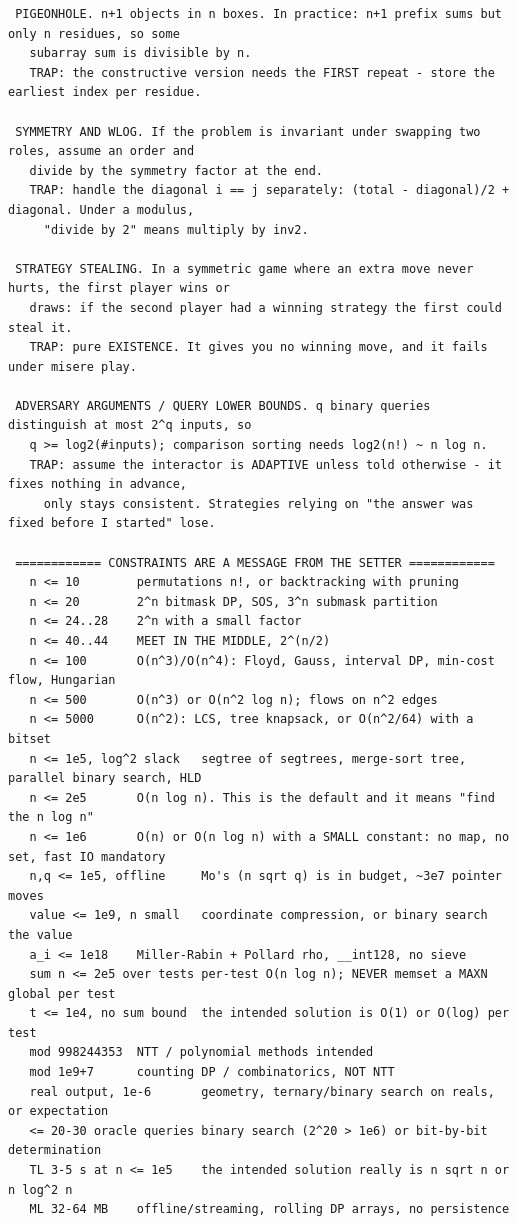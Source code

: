 \documentclass[9pt,a4paper,twocolumn]{extarticle}
\begin{document}
\begin{lstlisting}
 PIGEONHOLE. n+1 objects in n boxes. In practice: n+1 prefix sums but only n residues, so some
   subarray sum is divisible by n.
   TRAP: the constructive version needs the FIRST repeat - store the earliest index per residue.

 SYMMETRY AND WLOG. If the problem is invariant under swapping two roles, assume an order and
   divide by the symmetry factor at the end.
   TRAP: handle the diagonal i == j separately: (total - diagonal)/2 + diagonal. Under a modulus,
     "divide by 2" means multiply by inv2.

 STRATEGY STEALING. In a symmetric game where an extra move never hurts, the first player wins or
   draws: if the second player had a winning strategy the first could steal it.
   TRAP: pure EXISTENCE. It gives you no winning move, and it fails under misere play.

 ADVERSARY ARGUMENTS / QUERY LOWER BOUNDS. q binary queries distinguish at most 2^q inputs, so
   q >= log2(#inputs); comparison sorting needs log2(n!) ~ n log n.
   TRAP: assume the interactor is ADAPTIVE unless told otherwise - it fixes nothing in advance,
     only stays consistent. Strategies relying on "the answer was fixed before I started" lose.

 ============ CONSTRAINTS ARE A MESSAGE FROM THE SETTER ============
   n <= 10        permutations n!, or backtracking with pruning
   n <= 20        2^n bitmask DP, SOS, 3^n submask partition
   n <= 24..28    2^n with a small factor
   n <= 40..44    MEET IN THE MIDDLE, 2^(n/2)
   n <= 100       O(n^3)/O(n^4): Floyd, Gauss, interval DP, min-cost flow, Hungarian
   n <= 500       O(n^3) or O(n^2 log n); flows on n^2 edges
   n <= 5000      O(n^2): LCS, tree knapsack, or O(n^2/64) with a bitset
   n <= 1e5, log^2 slack   segtree of segtrees, merge-sort tree, parallel binary search, HLD
   n <= 2e5       O(n log n). This is the default and it means "find the n log n"
   n <= 1e6       O(n) or O(n log n) with a SMALL constant: no map, no set, fast IO mandatory
   n,q <= 1e5, offline     Mo's (n sqrt q) is in budget, ~3e7 pointer moves
   value <= 1e9, n small   coordinate compression, or binary search the value
   a_i <= 1e18    Miller-Rabin + Pollard rho, __int128, no sieve
   sum n <= 2e5 over tests per-test O(n log n); NEVER memset a MAXN global per test
   t <= 1e4, no sum bound  the intended solution is O(1) or O(log) per test
   mod 998244353  NTT / polynomial methods intended
   mod 1e9+7      counting DP / combinatorics, NOT NTT
   real output, 1e-6       geometry, ternary/binary search on reals, or expectation
   <= 20-30 oracle queries binary search (2^20 > 1e6) or bit-by-bit determination
   TL 3-5 s at n <= 1e5    the intended solution really is n sqrt n or n log^2 n
   ML 32-64 MB    offline/streaming, rolling DP arrays, no persistence


\end{lstlisting}
\end{document}
